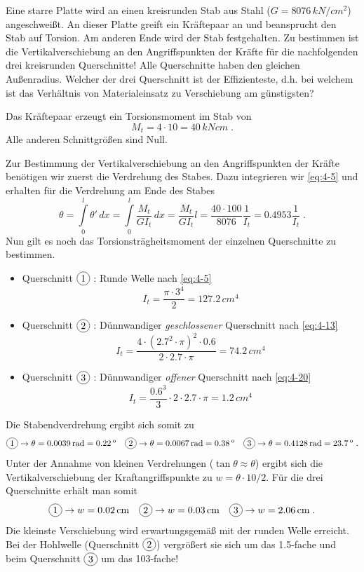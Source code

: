 \begin{example}
	Eine starre Platte wird an einen kreisrunden Stab aus Stahl ($G=8076\,\unit{kN/cm^2}$) angeschweißt.
	An dieser Platte greift ein Kräftepaar an und beansprucht den Stab auf Torsion.
	Am anderen Ende wird der Stab festgehalten.
	Zu bestimmen ist die Vertikalverschiebung an den Angriffspunkten der Kräfte für die nachfolgenden drei kreisrunden Querschnitte!
	Alle Querschnitte haben den gleichen Außenradius.
	Welcher der drei Querschnitt ist der Effizienteste, d.h. bei welchem ist das Verhältnis von Materialeinsatz zu Verschiebung am günstigsten?
	\begin{center}
		
	\end{center}
	
	\begin{center}
		
	\end{center}
	
	Das Kräftepaar erzeugt ein Torsionsmoment im Stab von 
	\[
	M_t = 4\cdot 10 = 40\,\unit{kNcm} \; .
	\]
	Alle anderen Schnittgrößen sind Null.
	
	
	Zur Bestimmung der Vertikalverschiebung an den Angriffspunkten der Kräfte benötigen wir zuerst die Verdrehung des Stabes.
	Dazu integrieren wir \eqref{eq:4-5} und erhalten für die Verdrehung am Ende des Stabes 
	\[
	\theta = \int\limits_0^l\theta'\,dx = \int\limits_0^l\dfrac{M_t}{GI_t}\,dx = \dfrac{M_t}{GI_t}l = \dfrac{40\cdot 100}{8076}\dfrac{1}{I_t} = 0.4953\dfrac{1}{I_t} \; .
	\]
	Nun gilt es noch das Torsionsträgheitsmoment der einzelnen Querschnitte zu bestimmen.
	\begin{itemize}
		\item Querschnitt $\circled{1}$ : Runde Welle nach \eqref{eq:4-5}
		\[
		I_t = \dfrac{\pi\cdot 3^4}{2} = 127.2\,\unit{cm^4}
		\] 
		\item Querschnitt $\circled{2}$ : Dünnwandiger \emph{geschlossener} Querschnitt nach \eqref{eq:4-13}
		\[
		I_t = \dfrac{4\cdot(2.7^2\cdot\pi)^2\cdot 0.6}{2\cdot2.7\cdot\pi} = 74.2\,\unit{cm^4}
		\]
		\item Querschnitt $\circled{3}$ : Dünnwandiger \emph{offener} Querschnitt nach \eqref{eq:4-20}
		\[
		I_t = \dfrac{0.6^3}{3}\cdot 2\cdot 2.7\cdot\pi = 1.2\,\unit{cm^4}
		\] 
	\end{itemize}
	Die Stabendverdrehung ergibt sich somit zu
	\[
	\circled{1}\rightarrow\theta = 0.0039\,\unit{rad} = 0.22\,\unit{^o} \quad \circled{2}\rightarrow\theta = 0.0067\,\unit{rad} = 0.38\,\unit{^o} \quad \circled{3}\rightarrow\theta = 0.4128\,\unit{rad} = 23.7\,\unit{^o} \; .
	\]
	Unter der Annahme von kleinen Verdrehungen ($\tan\theta\approx\theta$) ergibt sich die Vertikalverschiebung der Kraftangriffspunkte zu $w=\theta\cdot 10/2$.
	Für die drei Querschnitte erhält man somit
	\[
	\circled{1}\rightarrow w = 0.02\,\unit{cm} \quad \circled{2}\rightarrow w = 0.03\,\unit{cm} \quad \circled{3}\rightarrow w = 2.06\,\unit{cm} \; .
	\]
	Die kleinste Verschiebung wird erwartungsgemäß mit der runden Welle erreicht.
	Bei der Hohlwelle (Querschnitt $\circled{2}$) vergrößert sie sich um das 1.5-fache und beim Querschnitt $\circled{3}$ um das 103-fache!
	

\end{example}
